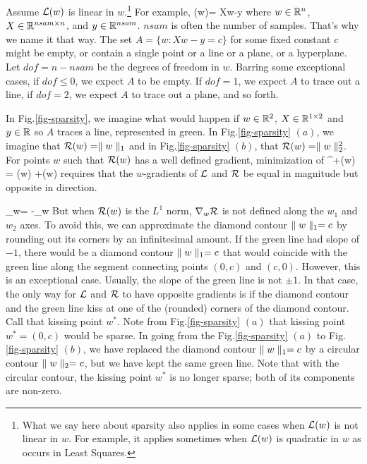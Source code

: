 Assume ${\cal L}(w)$ is linear in $w$.\footnote{What we say here about sparsity also applies in some cases when ${\cal L}(w)$ is not linear in $w$. For example, it applies sometimes when ${\cal L}(w)$
is quadratic in $w$ as occurs in Least Squares.}
For example,
\beq
\call(w)= Xw-y
\eeq
where $w\in{ \mathbb{R}}^n$, $X\in { \mathbb{R}}^{nsam\times n}$,  and $y\in{ \mathbb{R}}^{nsam}$.
$nsam$ is often the number of samples. That's why we name it that way.
The set $A=\{w: Xw-y=c\}$ for some fixed constant $c$  might be empty,
or contain a single point or a line or a plane, or a hyperplane. Let $dof=n-nsam$
be the degrees  of freedom in $w$.
Barring some exceptional cases, if $dof\leq 0$, we expect $A$ to be empty.
If $dof=1$, we expect $A$ to trace out a line, if $dof= 2$, we expect $A$ to
trace out a plane, and so forth.

In Fig.\ref{fig-sparsity}, we imagine
what would happen if
$w\in { \mathbb{R}}^2$, $X\in { \mathbb{R}}^{1\times 2}$
and $y\in { \mathbb{R}}$ so $A$ traces a line,
represented in green.
In Fig.\ref{fig-sparsity} $(a)$,
we imagine that ${\cal R}(w)=\parallel w\parallel_1$
and in Fig.\ref{fig-sparsity} $(b)$, that
${\cal R}(w)=\parallel w\parallel_2^2$.
For points $w$ such that ${\cal R}(w)$
has a well defined gradient,
minimization of
\beq
\call^+(w) = \call(w) +\calr(w)
\eeq
requires that the $w$-gradients of
${\cal L}$ and ${\cal R}$ be equal in magnitude but opposite in direction.

\beq
\nabla_w\call = -\nabla_w \calr
\eeq
But when ${\cal R}(w)$ is
the $L^1$ norm,  $\nabla_w{\cal R}$ is not defined along the $w_1$
and $w_2$ axes. To avoid this, we can
approximate the diamond contour $\parallel w\parallel_1=c$
by rounding out its corners
by an infinitesimal amount. If the green line had
slope of $-1$,
there would be a diamond contour
 $\parallel w\parallel_1=c$ that would coincide with the green line along the
 segment connecting points $(0,c)$
 and $(c,0)$. However, this is an exceptional case. Usually, the slope
 of the green line is not $\pm 1$.
 In that case, the only way for
 ${\cal L}$ and ${\cal R}$ to have
 opposite gradients is if the diamond
 contour and the green line
 kiss at one of the (rounded)  corners
 of the diamond contour. Call that
 kissing point $w^*$. Note from
 Fig.\ref{fig-sparsity} $(a)$ that kissing point $w^*=(0,c)$ would be
 sparse. In going from the Fig.\ref{fig-sparsity} $(a)$ to Fig.\ref{fig-sparsity} $(b)$,
 we have replaced the diamond contour
 $\parallel w\parallel_1=c$ by
 a circular contour $\parallel w\parallel_2=c$,
 but we have kept the same green line.
 Note that with the circular contour,
 the kissing point $w^*$ is no longer sparse; both of its components are non-zero.

